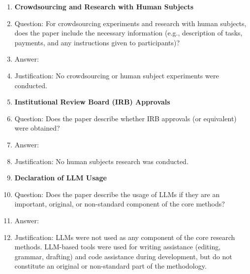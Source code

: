 \documentclass{article}
\begin{document}
\begin{enumerate}
\item {\bf Crowdsourcing and Research with Human Subjects}
\item[] Question: For crowdsourcing experiments and research with human subjects, does the paper include the necessary information (e.g., description of tasks, payments, and any instructions given to participants)?
\item[] Answer: \answerNA{}
\item[] Justification: No crowdsourcing or human subject experiments were conducted.

\item {\bf Institutional Review Board (IRB) Approvals}
\item[] Question: Does the paper describe whether IRB approvals (or equivalent) were obtained?
\item[] Answer: \answerNA{}
\item[] Justification: No human subjects research was conducted.

\item {\bf Declaration of LLM Usage}
\item[] Question: Does the paper describe the usage of LLMs if they are an important, original, or non-standard component of the core methods?
\item[] Answer: \answerNA{}
\item[] Justification: LLMs were not used as any component of the core research methods. LLM-based tools were used for writing assistance (editing, grammar, drafting) and code assistance during development, but do not constitute an original or non-standard part of the methodology.

\end{enumerate}
\end{document}
